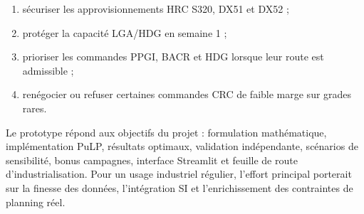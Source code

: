 \documentclass[12pt,a4paper]{article}
\begin{document}
\begin{enumerate}
    \item sécuriser les approvisionnements HRC S320, DX51 et DX52 ;
    \item protéger la capacité LGA/HDG en semaine 1 ;
    \item prioriser les commandes PPGI, BACR et HDG lorsque leur route est admissible ;
    \item renégocier ou refuser certaines commandes CRC de faible marge sur grades rares.
\end{enumerate}

Le prototype répond aux objectifs du projet : formulation mathématique, implémentation PuLP, résultats optimaux, validation indépendante, scénarios de sensibilité, bonus campagnes, interface Streamlit et feuille de route d'industrialisation. Pour un usage industriel régulier, l'effort principal porterait sur la finesse des données, l'intégration SI et l'enrichissement des contraintes de planning réel.
\end{document}
